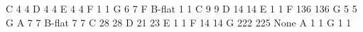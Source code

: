 \documentclass[letterpaper,10pt,english]{sphinxmanual}
\begin{document}
{\begin{sphinxVerbatim}[commandchars=\\\{\}]
                   C                              4             4
                   D                              4             4
                   E                              4             4
                   F                              1             1
                   G                              6             7
F                  B-flat                         1             1
                   C                              9             9
                   D                             14            14
                   E                              1             1
                   F                            136           136
                   G                              5             5
G                  A                              7             7
                   B-flat                         7             7
                   C                             28            28
                   D                             21            23
                   E                              1             1
                   F                             14            14
                   G                            222           225
None               A                              1             1
                   G                              1             1


\end{sphinxVerbatim}}
\end{document}
